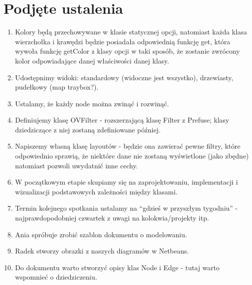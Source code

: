 \documentclass[a4paper,10pt]{article}
\begin{document}
\section{Podjęte ustalenia}
\begin{enumerate}
\item Kolory będą przechowywane w klasie statycznej opcji, natomiast każda klasa wierzchołka i krawędzi będzie posiadała odpowiednią funkcję get, która wywoła funkcję getColor z klasy opcji w taki sposób, że zostanie zwrócony kolor odpowiadające danej właściwości danej klasy. 
\item Udostępnimy widoki: standardowy (widoczne jest wszystko), drzewiasty, pudełkowy (map traybox?).
\item Ustalamy, że każdy node można zwinąć i rozwinąć.
\item Definiujemy klasę OVFilter - rozszerzającą klasę Filter z Prefuse; klasy dziedziczące z niej zostaną zdefiniowane później.
\item Napiszemy własną klasę layoutów - będzie ona zawierać pewne filtry, które odpowiednio sprawią, że niektóre dane nie zostaną wyświetlone (jako zbędne) natomiast pozwoli uwydatnić inne cechy.
\item W początkowym etapie skupiamy się na zaprojektowaniu, implementacji i wizualizacji podstawowych zależności między klasami.
\item Termin kolejnego spotkania ustalamy na ``gdzieś w przyszłym tygodniu'' - najprawdopodobniej czwartek z uwagi na kolokwia/projekty itp.
\item Ania spróbuje zrobić szablon dokumentu o modelowaniu.
\item Radek stworzy obrazki z naszych diagramów w Netbeans.
\item Do dokumentu warto stworzyć opisy klas Node i Edge - tutaj warto wspomnieć o dziedziczeniu.
\end{enumerate}



\clearpage
{}
{}

\end{document}
